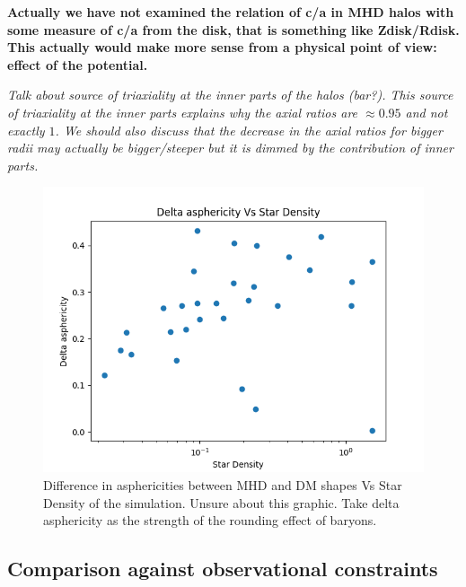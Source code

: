 \documentclass[a4paper,fleqn,usenatbib]{mnras}
\begin{document}
\textbf{Actually we have not examined the relation of c/a in MHD halos
  with some measure of c/a from the disk, that is something like
  Zdisk/Rdisk. This actually would make more sense from a physical
  point of view: effect of the potential. } 


\textit{ Talk about source of triaxiality at the inner parts of the
  halos (bar?). This source of triaxiality at the inner parts explains
  why the axial ratios are $\approx 0.95$ and not exactly $1$. We
  should also discuss that the decrease in the axial ratios for bigger
  radii may actually be bigger/steeper but it is dimmed by the
  contribution of inner parts.} 


\begin{figure}
  \includegraphics[width=\columnwidth]{./pics/Delta asphericity Vs Star Density.png}
  \caption{Difference in asphericities between MHD and DM shapes Vs
    Star Density of the simulation. Unsure about this graphic. Take
    delta asphericity as the strength of the rounding effect of
    baryons.}  
  \label{fig:Star_Density_effect}
\end{figure}



\subsection{Comparison against observational constraints}
\end{document}
